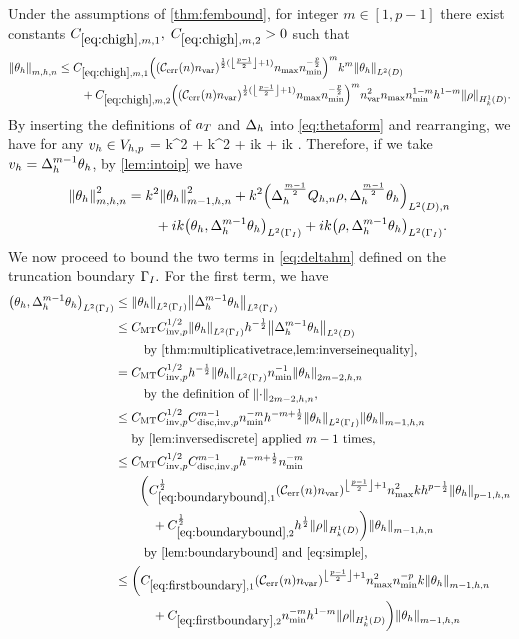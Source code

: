 \noindent Under the assumptions of \cref{thm:fembound}, for integer $m \in [1,p-1]$ there exist constants $\Chighmo,$ $\Chighmt > 0$ such that
\begin{align}
\Nfn{m,h,n}{\thetah} &\leq \Chighmo \mleft(\mleft(\En\nvar\mright)^{\half(\floor{\frac{p-1}2}+1)}\nmax\nmin^{-\frac{p}2}\mright)^mk^m \NLtD{\thetah}\nonumber\\
&\quad\quad+ \Chighmt \bracket^m \nvar^2 \nmax\nmin^{1-m} h^{1-m} \NHokD{\rho}.\label{eq:chigh}
\end{align}
\ele
{}
By inserting the definitions of $a_{T}$ and $\Delta_{h}$ into \cref{eq:thetaform} and rearranging, we have for any $v_{h} \in V_{h,p}$
\beqs
\IPLtDn{\Deltah \thetah}{\vh} = k^2 \IPLtDn{\thetah}{\vh} + k^2\IPLtDn{\Qhn \rho}{\vh} + ik \IPLtGI{\thetah}{\vh} + ik \IPLtGI{\rho}{\vh}.
\eeqs
Therefore, if we take $v_{h} = \Delta_{h}^{m-1}\theta_{h}$, by \cref{lem:intoip} we have
\begin{align}
  \Nfn{m,h,n}{\thetah}^2 &= k^2 \Nfn{m-1,h,n}{\thetah}^2 + k^2 \IPLtDn{\Deltah^{\frac{m-1}2} \Qhn \rho}{\Deltah^{\frac{m-1}2}\thetah}\nonumber\\
  &\quad\quad+ ik\IPLtGI{\thetah}{\Deltah^{m-1} \thetah} + ik \IPLtGI{\rho}{\Deltah^{m-1} \thetah}.\label{eq:deltahm}
\end{align}
We now proceed to bound the two terms in \cref{eq:deltahm} defined on the truncation boundary $\Gamma_{I}.$ For the first term, we have
\begin{align}
\IPLtGI{\thetah}{\Deltah^{m-1}\thetah} &\leq \NLtGI{\thetah}\NLtGI{\Deltah^{m-1}\thetah}\nonumber\\
&\leq \CMT \CinvVhp^{1/2} \NLtGI{\thetah} h^{-\half} \NLtD{\Deltah^{m-1} \thetah}\nonumber\\
&\quad\quad\text{ by \cref{thm:multiplicativetrace,lem:inverseinequality},}\nonumber\\
&= \CMT \CinvVhp^{1/2} h^{-\half}\NLtGI{\thetah}\nmin^{-1}\Nfn{2m-2,h,n}{\thetah}\nonumber\\
&\quad\quad\text{ by the definition of }\Nfn{2m-2,h,n}{\cdot},\nonumber\\
&\leq \CMT \CinvVhp^{1/2} \Chinv^{m-1} \nmin^{-m} h^{-m+\half} \NLtGI{\thetah}\Nfn{m-1,h,n}{\thetah}\nonumber\\
&\quad\text{ by \cref{lem:inversediscrete} applied } m-1 \text{ times,}\label{eq:useitagain}\\
&\leq \CMT \CinvVhp^{1/2} \Chinv^{m-1} h^{-m+\half} \nmin^{-m}\nonumber\\
&\quad\quad\bigg(\Cboundaryo^{\half} \mleft(\En\nvar\mright)^{\floor{\frac{p-1}2}+1}\nmax^2 k h^{p-\half} \Nfn{p-1,h,n}{\thetah}\nonumber\\
&\quad\quad\quad+ \Cboundaryt^{\half} h^{\half} \NHokD{\rho}\bigg)\Nfn{m-1,h,n}{\thetah}\nonumber\\
&\quad\quad\text{ by \cref{lem:boundarybound} and \cref{eq:simple},}\nonumber\\
&\leq \bigg(\CBo \mleft(\En\nvar\mright)^{\floor{\frac{p-1}2}+1}\nmax^2\nmin^{-p}k \Nfn{m-1,h,n}{\thetah}\nonumber\\
&\quad\quad\quad+ \CBt \nmin^{-m}h^{1-m} \NHokD{\rho}\bigg)\Nfn{m-1,h,n}{\thetah}\label{eq:firstboundary}
\end{align}
